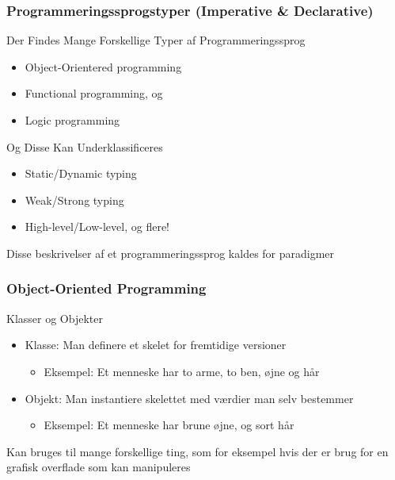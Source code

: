 \documentclass[12pt,t]{beamer}
\begin{document}
\begin{frame}
 \frametitle{Programmeringssprogstyper {\tiny (Imperative \& Declarative)}}
 \begin{block}{Der Findes Mange Forskellige Typer af Programmeringssprog}
 \begin{itemize}
  \item Object-Orientered programming
  \item Functional programming, og
  \item Logic programming
 \end{itemize}
 \end{block}
 \begin{exampleblock}{Og Disse Kan Underklassificeres}
 \begin{itemize}
 \item Static/Dynamic typing
 \item Weak/Strong typing
 \item High-level/Low-level, og flere!
 \end{itemize}
 \end{exampleblock}
 Disse beskrivelser af et programmeringssprog kaldes for paradigmer
\end{frame}

\begin{frame}
\frametitle{Object-Oriented Programming}
\begin{block}{Klasser og Objekter}
\begin{itemize}
\item Klasse: Man definere et skelet for fremtidige versioner\\
\begin{itemize}
\item Eksempel: Et menneske har to arme, to ben, øjne og hår
\end{itemize}
\item Objekt: Man instantiere skelettet med værdier man selv bestemmer\\
\begin{itemize}
\item Eksempel: Et menneske har brune øjne, og sort hår
\end{itemize}
\end{itemize}
\end{block}
\begin{block}{}
Kan bruges til mange forskellige ting, som for eksempel hvis der er brug for
en grafisk overflade som kan manipuleres
\end{block}
\end{frame}
\end{document}
